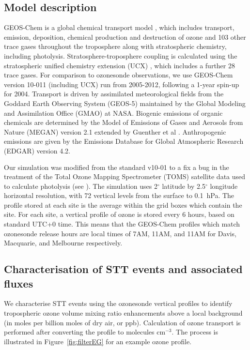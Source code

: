 \documentclass{article}
\begin{document}
  \subsection{Model description}
    \label{Section:GEOSChemDescription}
    GEOS-Chem is a global chemical transport model \citep{Bey2001}, which includes transport, emission, deposition, chemical production and destruction of ozone and 103 other trace gases throughout the troposphere along with stratospheric chemistry, including photolysis. 
    Stratosphere-troposphere coupling is calculated using the stratospheric unified chemistry extension (UCX) \citep{Eastham2014}, which includes a further 28 trace gases.
    For comparison to ozonesonde observations, we use GEOS-Chem version 10-011 (including UCX) run from 2005-2012, following a 1-year spin-up for 2004.
    Transport is driven by assimilated meteorological fields from the Goddard Earth Observing System (GEOS-5) maintained by the Global Modeling and Assimilation Office (GMAO) at NASA.
    Biogenic emissions of organic chemicals are determined by the Model of Emissions of Gases and Aerosols from Nature (MEGAN) version 2.1 extended by Guenther et al \citep{Guenther2012}.
    Anthropogenic emissions are given by the Emissions Database for Global Atmospheric Research (EDGAR) version 4.2.
  
    Our simulation was modified from the standard v10-01 to a fix a bug in the treatment of the Total Ozone Mapping Spectrometer (TOMS) satellite data used to calculate photolysis (see \citet{TomsFix2016}).
    The simulation uses 2$^{\circ}$ latitude by 2.5$^{\circ}$ longitude horizontal resolution, with 72 vertical levels from the surface to 0.1~hPa.
    The profile stored at each site is the average within the grid boxes which contain the site.
    For each site, a vertical profile of ozone is stored every 6 hours, based on standard UTC+0 time.
    This means that the GEOS-Chem profiles which match ozonesonde release hours are local times of 7AM, 11AM, and 11AM for Davis, Macquarie, and Melbourne respectively.
    
    
  \subsection{Characterisation of STT events and associated fluxes}
    \label{Section:CharacterisationOfSTTs}
    
    We characterise STT events using the ozonesonde vertical profiles to identify tropospheric ozone volume mixing ratio enhancements above a local background (in moles per billion moles of dry air, or ppb).
    Calculation of ozone transport is performed after converting the profile to molecules cm$^{-3}$.
    The process is illustrated in Figure~\ref{fig:filterEG} for an example ozone profile.
    
\end{document}
